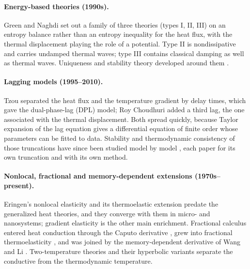 \paragraph{Energy-based theories (1990s).} Green and Naghdi \citep{Green1991,GreenGN1992,Green1993} set out a family of three theories (types I, II, III) on an entropy balance rather than an entropy inequality for the heat flux, with the thermal displacement playing the role of a potential. Type II is nondissipative and carries undamped thermal waves; type III contains classical damping as well as thermal waves. Uniqueness and stability theory developed around them \citep{Chandrasekharaiah1996}.

\paragraph{Lagging models (1995--2010).} Tzou \citep{Tzou1995,Tzou1997} separated the heat flux and the temperature gradient by delay times, which gave the dual-phase-lag (DPL) model; Roy Choudhuri \citep{RoyChoudhuri2007} added a third lag, the one associated with the thermal displacement. Both spread quickly, because Taylor expansion of the lag equation gives a differential equation of finite order whose parameters can be fitted to data. Stability and thermodynamic consistency of those truncations have since been studied model by model \citep{Quintanilla2003DPL,Chirita2016,Tibullo2017,vanDerMerwe2021}, each paper for its own truncation and with its own method.

\paragraph{Nonlocal, fractional and memory-dependent extensions (1970s--present).} Eringen's nonlocal elasticity \citep{Eringen1972,Eringen1983,Eringen2002} and its thermoelastic extension \citep{Eringen1974} predate the generalized heat theories, and they converge with them in micro- and nanosystems; gradient elasticity \citep{Aifantis1992,Aifantis2003,Askes2006,Askes2011} is the other main enrichment. Fractional calculus entered heat conduction through the Caputo derivative \citep{Caputo1967}, grew into fractional thermoelasticity \citep{Povstenko2004,Povstenko2007,Povstenko2009,Povstenko2011Cattaneo,Povstenko2016,Sherief2010Fractional,Ezzat2011}, and was joined by the memory-dependent derivative of Wang and Li \citep{Wang2011,Wang2021}. Two-temperature theories \citep{ChenGurtin1968,Youssef2006} and their hyperbolic variants \citep{Prasad2020,Alzahrani2020,Bassiouny2020} separate the conductive from the thermodynamic temperature.

